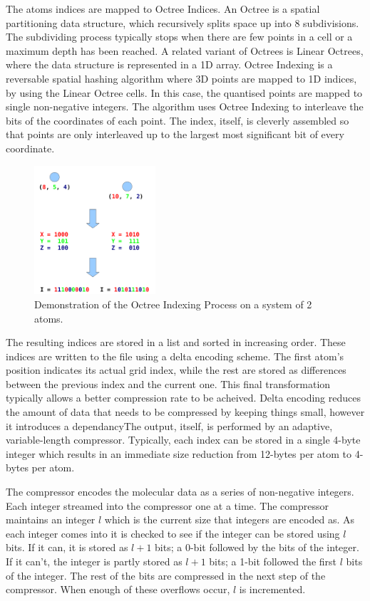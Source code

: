 \documentclass[a4paper,11pt]{report}
\begin{document}
The atoms indices are mapped to Octree Indices. An Octree is a spatial partitioning data structure, which recursively splits space up into 8 subdivisions. The subdividing process typically stops when there are few points in a cell or a maximum depth has been reached. A related variant of Octrees is Linear Octrees, where the data structure is represented in a 1D array. Octree Indexing is a reversable spatial hashing algorithm where 3D points are mapped to 1D indices, by using the Linear Octree cells. In this case, the quantised points are mapped to single non-negative integers. The algorithm uses Octree Indexing to interleave the bits of the coordinates of each point. The index, itself, is cleverly assembled so that points are only interleaved up to the largest most significant bit of every coordinate.

\begin{figure}
 \center
 \includegraphics[width=0.4\textwidth]{resources/OctreeIndexingVerticalCropped.png}
\caption{Demonstration of the Octree Indexing Process on a system of 2 atoms.}
\label{octree}
\end{figure}

The resulting indices are stored in a list and sorted in increasing order. These indices are written to the file using a delta encoding scheme. The first atom's position indicates its actual grid index, while the rest are stored as differences between the previous index and the current one. This final transformation typically allows a better compression rate to be acheived. Delta encoding reduces the amount of data that needs to be compressed by keeping things small, however it introduces a dependancyThe output, itself, is performed by an adaptive, variable-length compressor. Typically, each index can be stored in a single 4-byte integer which results in an immediate size reduction from 12-bytes per atom to 4-bytes per atom. 

The compressor encodes the molecular data as a series of non-negative integers. Each integer streamed into the compressor one at a time. The compressor maintains an integer $l$ which is the current size that integers are encoded as. As each integer comes into it is checked to see if the integer can be stored using $l$ bits. If it can, it is stored as $l+1$ bits; a 0-bit followed by the bits of the integer. If it can't, the integer is partly stored as $l+1$ bits; a 1-bit followed the first $l$ bits of the integer. The rest of the bits are compressed in the next step of the compressor. When enough of these overflows occur, $l$ is incremented.
\end{document}
